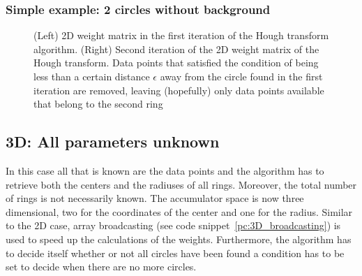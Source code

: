 \documentclass[11pt]{scrreprt}
\begin{document}

\subsubsection{Simple example: 2 circles without background} %
\label{ssub:simple_example_of_2_circles_without_background}
\begin{figure}[hp]
  \centering
  

  \caption[2D weight matrix, first iteration]{(Left) 2D weight matrix in the first iteration of the Hough transform algorithm. (Right) Second iteration
  of the 2D weight matrix of the Hough transform. Data points that satisfied the condition of being less than a certain distance $\epsilon$ 
  away from the circle found in the first iteration are removed, leaving (hopefully) only data points available that belong to the second ring}
  \label{fig:2d_weights_01}
\end{figure}

\subsection{3D: All parameters unknown} %
\label{sub:3d_nothing_is_known_find_everything}
In this case all that is known are the data points and the algorithm has to retrieve both the centers and the radiuses of all rings.
Moreover, the total number of rings is not necessarily known. The accumulator space is now three dimensional, two for the coordinates of the center and one for the radius. Similar to the 2D case, 
array broadcasting (see code snippet~\ref{pc:3D_broadcasting}) is used to speed up the calculations of the weights. Furthermore, 
the algorithm has to decide itself whether or not  all circles have been found a condition has to be set to decide when there are no more circles.
\end{document}
